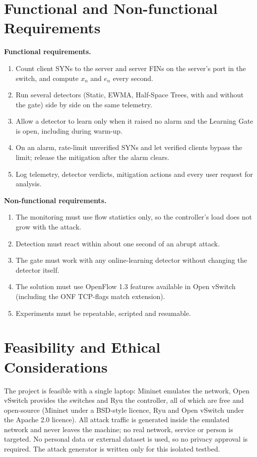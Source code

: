\documentclass[12pt,a4paper,oneside]{report}
\begin{document}
\section{Functional and Non-functional Requirements}
\textbf{Functional requirements.}
\begin{enumerate}
\item Count client SYNs to the server and server FINs on the server's port in the switch, and compute $x_n$ and $e_n$ every second.
\item Run several detectors (Static, EWMA, Half-Space Trees, with and without the gate) side by side on the same telemetry.
\item Allow a detector to learn only when it raised no alarm and the Learning Gate is open, including during warm-up.
\item On an alarm, rate-limit unverified SYNs and let verified clients bypass the limit; release the mitigation after the alarm clears.
\item Log telemetry, detector verdicts, mitigation actions and every user request for analysis.
\end{enumerate}
\textbf{Non-functional requirements.}
\begin{enumerate}
\item The monitoring must use flow statistics only, so the controller's load does not grow with the attack.
\item Detection must react within about one second of an abrupt attack.
\item The gate must work with any online-learning detector without changing the detector itself.
\item The solution must use OpenFlow 1.3 features available in Open vSwitch (including the ONF TCP-flags match extension).
\item Experiments must be repeatable, scripted and resumable.
\end{enumerate}

\section{Feasibility and Ethical Considerations}
The project is feasible with a single laptop: Mininet emulates the network, Open vSwitch provides the switches and Ryu the controller, all of which are free and open-source (Mininet under a BSD-style licence, Ryu and Open vSwitch under the Apache 2.0 licence). All attack traffic is generated inside the emulated network and never leaves the machine; no real network, service or person is targeted. No personal data or external dataset is used, so no privacy approval is required. The attack generator is written only for this isolated testbed.
\end{document}
